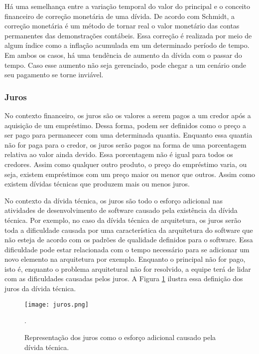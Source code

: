 Há uma semelhança entre a variação temporal do valor do principal e o conceito financeiro de correção monetária de uma dívida. De acordo com Schmidt\cite{santos2007teoria}, a correção monetária é um método de tornar real o valor monetário das contas permanentes das demonstrações contábeis. Essa correção é realizada por meio de algum índice como a inflação acumulada em um determinado período de tempo. Em ambos os casos, há uma tendência de aumento da dívida com o passar do tempo. Caso esse aumento não seja gerenciado, pode chegar a um cenário onde seu pagamento se torne inviável. 

\subsubsection{Juros} 

No contexto financeiro, os juros são os valores a serem pagos a um credor após a aquisição de um empréstimo. Dessa forma, podem ser definidos como o preço a ser pago para permanecer com uma determinada quantia. Enquanto essa quantia não for paga para o credor, os juros serão pagos na forma de uma porcentagem relativa ao valor ainda devido. Essa porcentagem não é igual para todos os credores. Assim como qualquer outro produto, o preço do empréstimo varia, ou seja, existem empréstimos com um preço maior ou menor que outros. Assim como existem dívidas técnicas que produzem mais ou menos juros.

No contexto da dívida técnica, os juros são todo o esforço adicional nas atividades de desenvolvimento de software causado pela existência da dívida técnica. Por exemplo, no caso da dívida técnica de arquitetura, os juros serão toda a dificuldade causada por uma característica da arquitetura do software que não esteja de acordo com os padrões de qualidade definidos para o software. Essa dificuldade pode estar relacionada com o tempo necessário para se adicionar um novo elemento na arquitetura por exemplo. Enquanto o principal não for pago, isto é, enquanto o problema arquitetural não for resolvido, a equipe terá de lidar com as dificuldades causadas pelos juros. A Figura \ref{fig:juros} ilustra essa definição dos juros da dívida técnica. 

\begin{figure}[H]
  \centering
  \texttt{[image: juros.png]} 
  \caption{Representação dos juros como o esforço adicional causado pela dívida técnica. }.
  \label{fig:juros} 
\end{figure}



